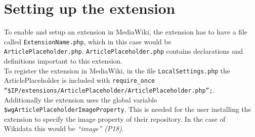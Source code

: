 \section{Setting up the extension}
	To enable and setup an extension in MediaWiki, the extension has to have a file called \texttt{\justify ExtensionName.php}, which in this case would be \texttt{\justify ArticlePlaceholder.php}. \texttt{\justify ArticlePlaceholder.php} contains declarations and definitions important to this extension. \\
	To register the extension in MediaWiki, in the file \texttt{\justify LocalSettings.php} the ArticlePlaceholder is included with \texttt{\justify require\_once ``\$IP/extensions/ArticlePlaceholder/ArticlePlaceholder.php'';}. \\
	Additionally the extension uses the global variable \texttt{\justify \$wgArticlePlaceholderImageProperty}. This is needed for the user installing the extension to specify the image property of their repository. In the case of Wikidata this would be \textit{``image'' (P18)}. \citep{wiki:23}
